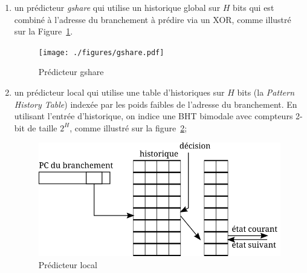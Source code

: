 \documentclass[a4paper]{article}
\begin{document}
\begin{enumerate}



\item un prédicteur \textit{gshare} qui utilise un historique global sur $H$ bits qui est combiné à l'adresse du branchement à prédire via un XOR, comme illustré sur la Figure~\ref{correlated}. 
      \begin{figure}[hbt]\center\leavevmode
      \texttt{[image: ./figures/gshare.pdf]}
      \caption{\label{correlated}Prédicteur gshare}
      \end{figure}

\item un prédicteur local qui utilise une table d'historiques sur $H$ bits (la \textit{Pattern History Table}) indexée par les poids faibles de l'adresse du branchement.  En utilisant l'entrée d'historique, on indice une BHT bimodale avec compteurs 2-bit de taille $2^H$, comme illustré sur la figure~\ref{local};
      \begin{figure}[hbt]\center\leavevmode
      \includegraphics[scale=.9]{local}
      \caption{Prédicteur local}
      \label{local}
      \end{figure}


\end{enumerate}
\end{document}
